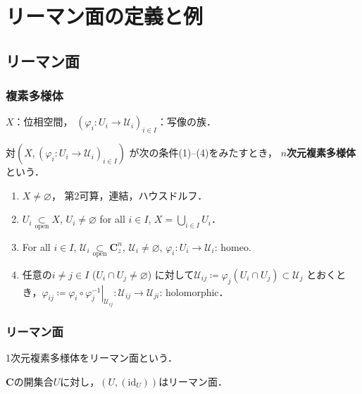 \documentclass[dvipdfmx,12pt,aspectratio=169]{beamer}%
\newcommand{\cc}{\mathbf{C}}
\newcommand{\mcal}{\mathcal}
\newcommand{\pphi}{\varphi} %
\newcommand{\UU}{\mcal{U}}
\newcommand{\emp}{\varnothing}
\newcommand{\ceq}{\coloneqq}
\newcommand{\sbs}{\subset}
\newcommand{\mapres}[2]{\left. #1 \right|_{#2}}
\newcommand{\id}{\mathrm{id}}
\begin{document}
\section{リーマン面の定義と例}
\subsection{リーマン面}

\begin{frame}
    \frametitle{複素多様体}

    \begin{Definition}[複素多様体]
        $X$：位相空間，
        $(\pphi_i\colon U_i\to\UU_i)_{i\in I}$：写像の族．

        対$\left(X, (\pphi_i\colon U_i\to\UU_i)_{i\in I}\right)$
        が次の条件(1)--(4)をみたすとき，
        $n$\textbf{次元複素多様体}という．
        \begin{enumerate}
            \item $X\neq\varnothing$，
            第2可算，連結，ハウスドルフ．
            \item $U_i \underset{\text{open}}{\subset} X$,\quad 
            $U_i\neq\varnothing$ for all $i\in I$,\quad 
            $X=\bigcup_{i\in I} U_i$．
            \item For all $i\in I$,\quad
            $\UU_i \underset{\text{open}}{\subset} \cc^n_z$,\quad 
            $\UU_i\neq\varnothing$, \quad
            $\pphi_{i}\colon U_i\to\UU_i$: homeo.
            \item 任意の$i\neq j \in I$ ($U_i\cap U_j \neq \emp$) 
            に対して$\UU_{ij}\ceq \pphi_j(U_i\cap U_j)\sbs \UU_j$
            とおくとき，$\pphi_{ij}\ceq 
            \mapres{\pphi_{i}\circ\pphi_{j}^{-1}}{\UU_{ij}}
            \colon 
            \UU_{ij}\to\UU_{ji}$: holomorphic．
        \end{enumerate}
    \end{Definition}

\end{frame}

\begin{frame}
    \frametitle{リーマン面}

    \begin{Definition}[リーマン面]
        1次元複素多様体をリーマン面という．
    \end{Definition}

    \begin{example}
        $\cc$の開集合$U$に対し，$(U,(\id_{U}))$はリーマン面．
    \end{example}
\end{frame}
\end{document}
